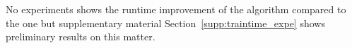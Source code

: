
No experiments shows the runtime improvement of the \qkmeans algorithm compared to the \kmeans one but supplementary material Section~\ref{supp:traintime_expe} shows preliminary results on this matter.


